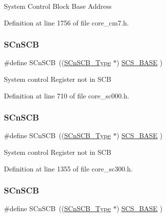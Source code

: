System Control Block Base Address 

Definition at line 1756 of file core\+\_\+cm7.\+h.

\mbox{\label{group___c_m_s_i_s__core__base_ga9fe0cd2eef83a8adad94490d9ecca63f}} 
\subsubsection{\texorpdfstring{S\+Cn\+S\+CB}{SCnSCB}\hspace{0.1cm}{\footnotesize\ttfamily [1/5]}}
{\footnotesize\ttfamily \#define S\+Cn\+S\+CB~((\hyperlink{struct_s_cn_s_c_b___type}{S\+Cn\+S\+C\+B\+\_\+\+Type}    $\ast$)     \hyperlink{group___c_m_s_i_s__core__base_ga3c14ed93192c8d9143322bbf77ebf770}{S\+C\+S\+\_\+\+B\+A\+SE}      )}

System control Register not in S\+CB 

Definition at line 710 of file core\+\_\+sc000.\+h.

\mbox{\label{group___c_m_s_i_s__core__base_ga9fe0cd2eef83a8adad94490d9ecca63f}} 
\subsubsection{\texorpdfstring{S\+Cn\+S\+CB}{SCnSCB}\hspace{0.1cm}{\footnotesize\ttfamily [2/5]}}
{\footnotesize\ttfamily \#define S\+Cn\+S\+CB~((\hyperlink{struct_s_cn_s_c_b___type}{S\+Cn\+S\+C\+B\+\_\+\+Type}    $\ast$)     \hyperlink{group___c_m_s_i_s__core__base_ga3c14ed93192c8d9143322bbf77ebf770}{S\+C\+S\+\_\+\+B\+A\+SE}      )}

System control Register not in S\+CB 

Definition at line 1355 of file core\+\_\+sc300.\+h.

\mbox{\label{group___c_m_s_i_s__core__base_ga9fe0cd2eef83a8adad94490d9ecca63f}} 
\subsubsection{\texorpdfstring{S\+Cn\+S\+CB}{SCnSCB}\hspace{0.1cm}{\footnotesize\ttfamily [3/5]}}
{\footnotesize\ttfamily \#define S\+Cn\+S\+CB~((\hyperlink{struct_s_cn_s_c_b___type}{S\+Cn\+S\+C\+B\+\_\+\+Type}    $\ast$)     \hyperlink{group___c_m_s_i_s__core__base_ga3c14ed93192c8d9143322bbf77ebf770}{S\+C\+S\+\_\+\+B\+A\+SE}      )}

